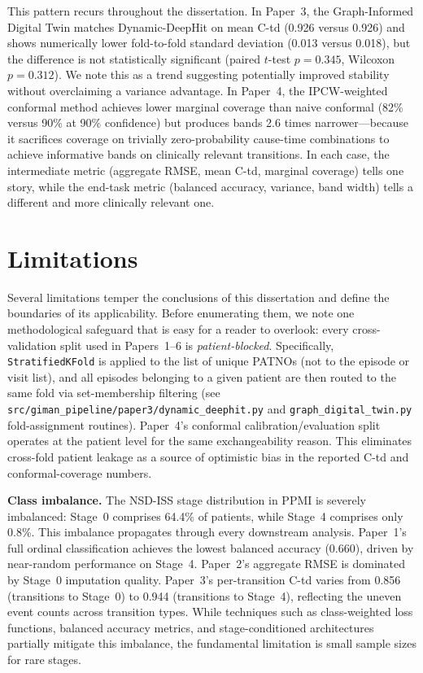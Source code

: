 This pattern recurs throughout the dissertation. In Paper~3, the Graph-Informed Digital Twin matches Dynamic-DeepHit on mean C-td (0.926 versus 0.926) and shows numerically lower fold-to-fold standard deviation (0.013 versus 0.018), but the difference is not statistically significant (paired $t$-test $p=0.345$, Wilcoxon $p=0.312$). We note this as a trend suggesting potentially improved stability without overclaiming a variance advantage. In Paper~4, the IPCW-weighted conformal method achieves lower marginal coverage than naive conformal (82\% versus 90\% at 90\% confidence) but produces bands 2.6 times narrower---because it sacrifices coverage on trivially zero-probability cause-time combinations to achieve informative bands on clinically relevant transitions. In each case, the intermediate metric (aggregate RMSE, mean C-td, marginal coverage) tells one story, while the end-task metric (balanced accuracy, variance, band width) tells a different and more clinically relevant one.


\section{Limitations}
\label{sec:limitations}

Several limitations temper the conclusions of this dissertation and define the boundaries of its applicability. Before enumerating them, we note one methodological safeguard that is easy for a reader to overlook: every cross-validation split used in Papers~1--6 is \emph{patient-blocked}. Specifically, \texttt{StratifiedKFold} is applied to the list of unique PATNOs (not to the episode or visit list), and all episodes belonging to a given patient are then routed to the same fold via set-membership filtering (see \texttt{src/giman\_pipeline/paper3/dynamic\_deephit.py} and \texttt{graph\_digital\_twin.py} fold-assignment routines). Paper~4's conformal calibration/evaluation split operates at the patient level for the same exchangeability reason. This eliminates cross-fold patient leakage as a source of optimistic bias in the reported C-td and conformal-coverage numbers.

\textbf{Class imbalance.} The NSD-ISS stage distribution in PPMI is severely imbalanced: Stage~0 comprises 64.4\% of patients, while Stage~4 comprises only 0.8\%. This imbalance propagates through every downstream analysis. Paper~1's full ordinal classification achieves the lowest balanced accuracy (0.660), driven by near-random performance on Stage~4. Paper~2's aggregate RMSE is dominated by Stage~0 imputation quality. Paper~3's per-transition C-td varies from 0.856 (transitions to Stage~0) to 0.944 (transitions to Stage~4), reflecting the uneven event counts across transition types. While techniques such as class-weighted loss functions, balanced accuracy metrics, and stage-conditioned architectures partially mitigate this imbalance, the fundamental limitation is small sample sizes for rare stages.

